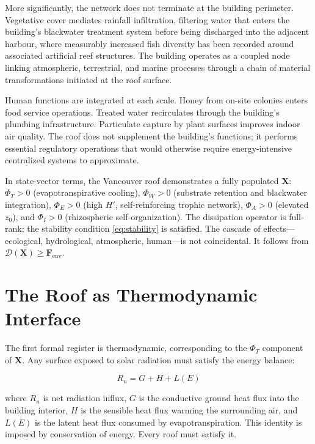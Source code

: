 \documentclass[12pt, a4paper]{article}
\theoremstyle{plain}
\theoremstyle{remark}
\begin{document}
More significantly, the network does not terminate at the building perimeter. Vegetative cover mediates rainfall infiltration, filtering water that enters the building's blackwater treatment system before being discharged into the adjacent harbour, where measurably increased fish diversity has been recorded around associated artificial reef structures. The building operates as a coupled node linking atmospheric, terrestrial, and marine processes through a chain of material transformations initiated at the roof surface.

Human functions are integrated at each scale. Honey from on-site colonies enters food service operations. Treated water recirculates through the building's plumbing infrastructure. Particulate capture by plant surfaces improves indoor air quality. The roof does not supplement the building's functions; it performs essential regulatory operations that would otherwise require energy-intensive centralized systems to approximate.

In state-vector terms, the Vancouver roof demonstrates a fully populated $\mathbf{X}$: $\Phi_T > 0$ (evapotranspirative cooling), $\Phi_W > 0$ (substrate retention and blackwater integration), $\Phi_E > 0$ (high $H'$, self-reinforcing trophic network), $\Phi_A > 0$ (elevated $z_0$), and $\Phi_I > 0$ (rhizospheric self-organization). The dissipation operator is full-rank; the stability condition \eqref{eq:stability} is satisfied. The cascade of effects---ecological, hydrological, atmospheric, human---is not coincidental. It follows from $\mathcal{D}(\mathbf{X}) \geq \mathbf{F}_{\text{env}}$.

\section{The Roof as Thermodynamic Interface}

The first formal register is thermodynamic, corresponding to the $\Phi_T$ component of $\mathbf{X}$. Any surface exposed to solar radiation must satisfy the energy balance:

\begin{equation}
R_n = G + H + L(E)
\label{eq:energy_balance}
\end{equation}

\noindent where $R_n$ is net radiation influx, $G$ is the conductive ground heat flux into the building interior, $H$ is the sensible heat flux warming the surrounding air, and $L(E)$ is the latent heat flux consumed by evapotranspiration. This identity is imposed by conservation of energy. Every roof must satisfy it.
\end{document}
